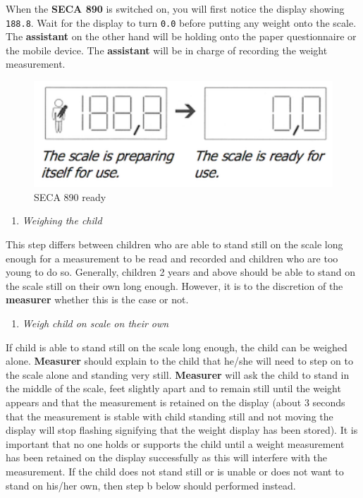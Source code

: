 \documentclass[12pt,]{book}
\providecommand{\tightlist}{%
  \setlength{\itemsep}{0pt}\setlength{\parskip}{0pt}}
\theoremstyle{definition}
\theoremstyle{definition}
\theoremstyle{definition}
\theoremstyle{remark}
\begin{document}
When the \textbf{SECA 890} is switched on, you will first notice the
display showing \texttt{188.8}. Wait for the display to turn
\texttt{0.0} before putting any weight onto the scale. The
\textbf{assistant} on the other hand will be holding onto the paper
questionnaire or the mobile device. The \textbf{assistant} will be in
charge of recording the weight measurement.

\begin{figure}

{\centering \includegraphics[width=4.86in]{images/seca890zero} 

}

\caption{SECA 890 ready}\label{fig:weight8}
\end{figure}

\begin{enumerate}
\def\labelenumi{\arabic{enumi}.}
\setcounter{enumi}{2}
\tightlist
\item
  \emph{Weighing the child}
\end{enumerate}

This step differs between children who are able to stand still on the
scale long enough for a measurement to be read and recorded and children
who are too young to do so. Generally, children 2 years and above should
be able to stand on the scale still on their own long enough. However,
it is to the discretion of the \textbf{measurer} whether this is the
case or not.

\begin{enumerate}
\def\labelenumi{\alph{enumi}.}
\tightlist
\item
  \emph{Weigh child on scale on their own}
\end{enumerate}

If child is able to stand still on the scale long enough, the child can
be weighed alone. \textbf{Measurer} should explain to the child that
he/she will need to step on to the scale alone and standing very still.
\textbf{Measurer} will ask the child to stand in the middle of the
scale, feet slightly apart and to remain still until the weight appears
and that the measurement is retained on the display (about 3 seconds
that the measurement is stable with child standing still and not moving
the display will stop flashing signifying that the weight display has
been stored). It is important that no one holds or supports the child
until a weight measurement has been retained on the display successfully
as this will interfere with the measurement. If the child does not stand
still or is unable or does not want to stand on his/her own, then step b
below should performed instead.
\end{document}
